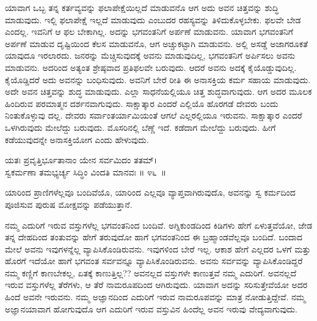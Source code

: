 ಯಾವಾಗ ಒಬ್ಬ ತನ್ನ ಕರ್ತವ್ಯವನ್ನು ಫಲಾಪೇಕ್ಷೆಯಿಲ್ಲದೆ ಮಾಡುವನೊ ಆಗ ಅದು ಅವನ ಚಿತ್ತವನ್ನು ಶುದ್ಧಿ ಮಾಡುವುದು. ಇಲ್ಲಿ ಫಲಾಪೇಕ್ಷೆ ಇಲ್ಲದೆ ಮಾಡುವುದು ಎಂಬುದರ ರಹಸ್ಯವನ್ನು ತಿಳಿದುಕೊಳ್ಳಬೇಕು. ಫಲವೇ ಬೇಡ ಎಂದಲ್ಲ. ಇವನಿಗೆ ಆ ಫಲ ಬೇಕಾಗಿಲ್ಲ. ಅದನ್ನು ಭಗವಂತನಿಗೆ ಅರ್ಪಣೆ ಮಾಡುವನು. ಯಾವಾಗ ಭಗವಂತನಿಗೆ ಅರ್ಪಣೆ ಮಾಡುವ ದೃಷ್ಟಿಯಿಂದ ಕೆಲಸ ಮಾಡುವನೊ, ಆಗ ಅಚ್ಚುಕಟ್ಟಾಗಿ ಮಾಡುವನು. ಅಲ್ಲಿ ಅಸಡ್ಡೆ ಅಜಾಗರೂಕತೆ ಯಾವುದೂ ಇರಲಾರದು. ಜನರನ್ನು ಮೆಚ್ಚಿಸುವುದಕ್ಕೆ ಅವನು ಮಾಡುವುದಿಲ್ಲ, ಭಗವಂತನಿಗೆ ಅರ್ಪಿಸಲು ಅವನು ಮಾಡುವನು. ಅದರಿಂದ ಅತ್ಯಂತ ಶ್ರೇಷ್ಠವಾದ ಪ್ರತಿಫಲವೇ ಬರುವುದು. ಆದರೆ ಅವನು ಅದಕ್ಕೆ ಕೈಯೊಡ್ಡುವುದಿಲ್ಲ. ಕೈಯೊಡ್ಡಿದರೆ ಅದು ಅವನನ್ನು ಬಂಧಿಸುವುದು. ಅವನಿಗೆ ಬೇರೆ ರೀತಿ ಈ ಅನಾಸಕ್ತಿಯ ಕರ್ಮ ಸಹಾಯ ಮಾಡುವುದು. ಅದೇ ಅವನ ಚಿತ್ತವನ್ನು ಶುದ್ಧ ಮಾಡುವುದು. ಎಲ್ಲಾ ಸಾಧನೆಯಲ್ಲಿಯೂ ಚಿತ್ತ ಶುದ್ಧವಾಗುವುದು. ಆಗ ಅದರ ಮೂಲಕ ಹಿಂದಿರುವ ಪರಮಾತ್ಮನ ದರ್ಶನವಾಗುವುದು. ಸಾಕ್ಷಾತ್ಕಾರ ಎಂದರೆ ಎಲ್ಲಿಯೊ ಹೊರಗಡೆ ದೇವರು ಬಂದು ನಿಂತುಕೊಳ್ಳುವು ದಲ್ಲ. ದೇವರು ಸರ್ವಾಂತರ್ಯಾಮಿಯಂತೆ ಆಗಲೆ ಎಲ್ಲರಲ್ಲಿಯೂ ಇರುವನು. ಸಾಕ್ಷಾತ್ಕಾರ ಎಂದರೆ ಒಳಗಿರುವುದು ಮೇಲೆದ್ದು ಬರುವುದು. ಮೊಸರಿನಲ್ಲಿ ಬೆಣ್ಣೆ ಇದೆ. ಕಡೆದಾಗ ಮೇಲೆದ್ದು ಬರುವುದು. ಹೀಗೆ ಕಡೆಯುವುದನ್ನೇ ಅನಾಸಕ್ತಿಯೋಗ ಎಂದು ಹೇಳುವುದು.

\begin{shloka}
ಯತಃ ಪ್ರವೃತ್ತಿರ್ಭೂತಾನಾಂ ಯೇನ ಸರ್ವಮಿದಂ ತತಮ್​।\\ಸ್ವಕರ್ಮಣಾ ತಮಭ್ಯರ್ಚ್ಯ ಸಿದ್ಧಿಂ ವಿಂದತಿ ಮಾನವಃ \hfill॥ ೪೬~॥
\end{shloka}

\begin{artha}
ಯಾರಿಂದ ಪ್ರಾಣಿಗಳೆಲ್ಲವೂ ಬಂದಿವೆಯೊ, ಯಾರಿಂದ ಎಲ್ಲವೂ ವ್ಯಾಪ್ತವಾಗಿರುವುದೊ, ಅವನನ್ನು ಸ್ವ ಕರ್ಮದಿಂದ ಪೂಜಿಸುವ ಪುರುಷ ಮೋಕ್ಷವನ್ನು ಪಡೆಯುತ್ತಾನೆ.
\end{artha}

ನಮ್ಮ ಎದುರಿಗೆ ಇರುವ ವಸ್ತುಗಳೆಲ್ಲ ಭಗವಂತನಿಂದ ಬಂದಿವೆ. ಅಗ್ನಿಕುಂಡದಿಂದ ಕಿಡಿಗಳು ಹೇಗೆ ಏಳುತ್ತವೆಯೋ, ಜೇಡ ತನ್ನ ದೇಹದಿಂದ ತಂತುವನ್ನು ಹೇಗೆ ತರುವುದೋ ಹಾಗೆ ಭಗವಂತನಿಂದ ಈ ಬ್ರಹ್ಮಾಂಡವೆಲ್ಲವೂ ಬಂದಿದೆ. ಬಂದಾದ ಮೇಲೆ ಅವನು ಇವುಗಳನ್ನೆಲ್ಲ ವ್ಯಾಪಿಸಿಕೊಂಡಿರುವನು. ಇವುಗಳಿಂದ ಬೇರೆ ಇಲ್ಲ. ಆಕಾಶ ಹೇಗೆ ಎಲ್ಲದರ ಒಳಗೆ ಮತ್ತು ಹೊರಗೆ ಇದೆಯೋ ಹಾಗೆ ಭಗವಂತ ಸರ್ವವನ್ನೂ ವ್ಯಾಪಿಸಿಕೊಂಡಿರುವನು. ಅವನು ಸರ್ವವನ್ನು ವ್ಯಾಪಿಸಿಕೊಂಡಿದ್ದರೆ ನಮ್ಮ ಕಣ್ಣಿಗೆ ಕಾಣಬೇಕಲ್ಲ, ಏತಕ್ಕೆ ಕಾಣುತ್ತಿಲ್ಲ?? ಅವನಲ್ಲದ ವಸ್ತುಗಳೇ ಕಾಣುತ್ತವೆ ನಮ್ಮ ಎದುರಿಗೆ. ಅವನಲ್ಲದೆ ಇರುವ ವಸ್ತುಗಳೆಲ್ಲ ತೆರೆಗಳು, ಆ ತೆರೆ ನಾಮರೂಪದಿಂದ ಆಗಿರುವುದು. ಯಾವಾಗ ಅದನ್ನು ಸರಿಸುತ್ತೇವೆಯೋ ಅದರ ಹಿಂದೆ ಅವನೇ ಇರುವನು. ನಮ್ಮ ಅಜ್ಞಾನದಿಂದ ಎದುರಿಗೆ ಇರುವ ನಾಮರೂಪವನ್ನು ಮಾತ್ರ ನೋಡುತ್ತಿದ್ದೇವೆ. ನಮ್ಮ ಅಜ್ಞಾನ\break ಯಾವಾಗ ಹೋಗುವುದೊ ಆಗ ಎದುರಿಗೆ ಇರುವ ವಸ್ತುವಿನ ಹಿಂದೆಲ್ಲ ಅವನ ಇರುವು ವೇದ್ಯವಾಗುವುದು.

